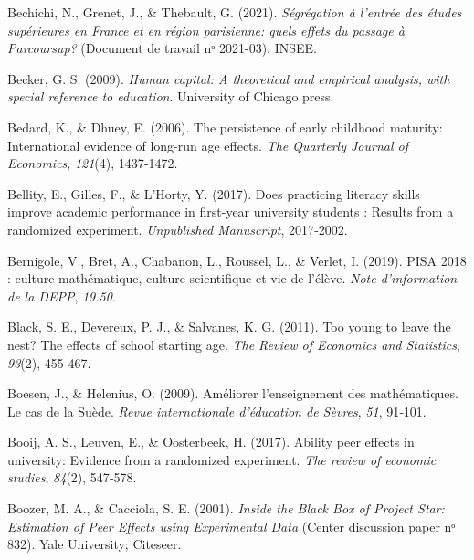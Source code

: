 \documentclass[
]{book}
\newlength{\cslhangindent}
\newlength{\cslentryspacingunit} %
\newenvironment{CSLReferences}[2] %
 {%
  \setlength{\parindent}{0pt}
  \ifodd #1
  \let\oldpar\par
  \def\par{\hangindent=\cslhangindent\oldpar}
  \fi
  \setlength{\parskip}{#2\cslentryspacingunit}
 }%
 {}
\begin{document}
\begin{CSLReferences}{1}{2}
\leavevmode{}%
Bechichi, N., Grenet, J., \& Thebault, G. (2021). \emph{S{é}gr{é}gation {à} l'entr{é}e des {é}tudes sup{é}rieures en France et en r{é}gion parisienne: quels effets du passage {à} Parcoursup?} (Document de travail nᵒ 2021-03). INSEE.

\leavevmode{}%
Becker, G. S. (2009). \emph{Human capital: A theoretical and empirical analysis, with special reference to education}. University of Chicago press.

\leavevmode{}%
Bedard, K., \& Dhuey, E. (2006). The persistence of early childhood maturity: International evidence of long-run age effects. \emph{The Quarterly Journal of Economics}, \emph{121}(4), 1437‑1472.

\leavevmode{}%
Bellity, E., Gilles, F., \& L'Horty, Y. (2017). Does practicing literacy skills improve academic performance in first-year university students : Results from a randomized experiment. \emph{Unpublished Manuscript}, 2017‑2002.

\leavevmode{}%
Bernigole, V., Bret, A., Chabanon, L., Roussel, L., \& Verlet, I. (2019). PISA 2018 : culture mathématique, culture scientifique et vie de l'élève. \emph{Note d'information de la DEPP}, \emph{19.50}.

\leavevmode{}%
Black, S. E., Devereux, P. J., \& Salvanes, K. G. (2011). Too young to leave the nest? The effects of school starting age. \emph{The Review of Economics and Statistics}, \emph{93}(2), 455‑467.

\leavevmode{}%
Boesen, J., \& Helenius, O. (2009). Am{é}liorer l'enseignement des math{é}matiques. Le cas de la Su{è}de. \emph{Revue internationale d'{é}ducation de S{è}vres}, \emph{51}, 91‑101.

\leavevmode{}%
Booij, A. S., Leuven, E., \& Oosterbeek, H. (2017). Ability peer effects in university: Evidence from a randomized experiment. \emph{The review of economic studies}, \emph{84}(2), 547‑578.

\leavevmode{}%
Boozer, M. A., \& Cacciola, S. E. (2001). \emph{Inside the Black Box of Project Star: Estimation of Peer Effects using Experimental Data} (Center discussion paper nᵒ 832). Yale University; Citeseer.


\end{CSLReferences}
\end{document}

